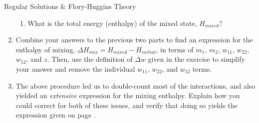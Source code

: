 \begin{activity}{Regular Solutions \& Flory-Huggins Theory}
\begin{exercises}
\begin{enumerate}
\begin{enumerate}
			\item What is the total energy (enthalpy) of the mixed state, $H_{mixed}$?
			
				\begin{solution}\end{solution}
				
		\end{enumerate}
		
	\item Combine your answers to the previous two parts to find an expression for the enthalpy of mixing, $\Delta H_{mix} = H_{mixed} - H_{initial}$, in terms of $m_1$, $m_2$, $w_{11}$, $w_{22}$, $w_{12}$, and $z$.  Then, use the definition of $\Delta w$ given in the exercise to simplify your answer and remove the individual $w_{11}$, $w_{22}$, and $w_{12}$ terms.
	
		\begin{solution}\end{solution}
		
	\item The above procedure led us to double-count most of the interactions, and also yielded an \emph{extensive} expression for the mixing enthalpy.  Explain how you could correct for both of these issues, and verify that doing so yields the expression given on page \pageref{\labelbase:eqn:Hmix}.
	
		\begin{solution}\end{solution}
		
	\end{enumerate}
					
\end{exercises}
	
\end{activity}